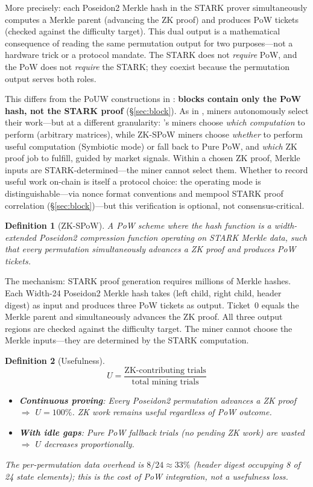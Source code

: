 \documentclass[11pt,a4paper]{article}
\newtheorem{definition}{Definition}
\begin{document}
More precisely: each Poseidon2 Merkle hash in the STARK prover simultaneously computes a Merkle parent (advancing the ZK proof) and produces PoW tickets (checked against the difficulty target). This dual output is a mathematical consequence of reading the same permutation output for two purposes---not a hardware trick or a protocol mandate. The STARK does not \emph{require} PoW, and the PoW does not \emph{require} the STARK; they coexist because the permutation output serves both roles.

This differs from the PoUW constructions in \cite{ball2017,ofelimos,komargodski2025}: \textbf{blocks contain only the PoW hash, not the STARK proof} (\S\ref{sec:block}). As in \cite{komargodski2025}, miners autonomously select their work---but at a different granularity: \cite{komargodski2025}'s miners choose \emph{which computation} to perform (arbitrary matrices), while ZK-SPoW miners choose \emph{whether} to perform useful computation (Symbiotic mode) or fall back to Pure PoW, and \emph{which} ZK proof job to fulfill, guided by market signals. Within a chosen ZK proof, Merkle inputs are STARK-determined---the miner cannot select them. Whether to record useful work on-chain is itself a protocol choice: the operating mode is distinguishable---via nonce format conventions and mempool STARK proof correlation (\S\ref{sec:block})---but this verification is optional, not consensus-critical.

\begin{definition}[ZK-SPoW]
A PoW scheme where the hash function is a width-extended Poseidon2 compression function operating on STARK Merkle data, such that every permutation simultaneously advances a ZK proof and produces PoW tickets.
\end{definition}

The mechanism: STARK proof generation requires millions of Merkle hashes. Each Width-24 Poseidon2 Merkle hash takes (left child, right child, header digest) as input and produces three PoW tickets as output. Ticket~0 equals the Merkle parent and simultaneously advances the ZK proof. All three output regions are checked against the difficulty target. The miner cannot choose the Merkle inputs---they are determined by the STARK computation.

\begin{definition}[Usefulness]\label{sec:pouw-paradox}
$$U = \frac{\text{ZK-contributing trials}}{\text{total mining trials}}$$
\begin{itemize}
\item \textbf{Continuous proving}: Every Poseidon2 permutation advances a ZK proof $\Rightarrow$ $U = 100\%$. ZK work remains useful regardless of PoW outcome.
\item \textbf{With idle gaps}: Pure PoW fallback trials (no pending ZK work) are wasted $\Rightarrow$ $U$ decreases proportionally.
\end{itemize}
The per-permutation data overhead is $8/24 \approx 33\%$ (header digest occupying 8 of 24 state elements); this is the cost of PoW integration, not a usefulness loss.
\end{definition}
\end{document}

